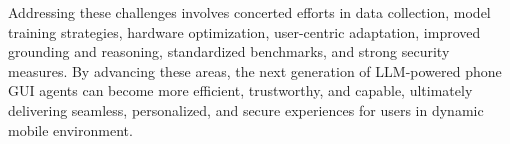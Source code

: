 Addressing these challenges involves concerted efforts in data collection, model training strategies, hardware optimization, user-centric adaptation, improved grounding and reasoning, standardized benchmarks, and strong security measures. By advancing these areas, the next generation of LLM-powered phone GUI agents can become more efficient, trustworthy, and capable, ultimately delivering seamless, personalized, and secure experiences for users in dynamic mobile environment.
